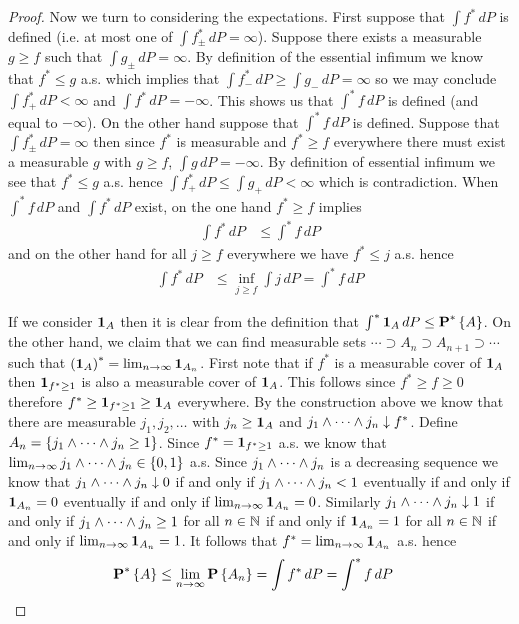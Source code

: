 \begin{proof}
Now we turn to considering the expectations.  First suppose that $\int f^* \, dP$ is defined (i.e. at most one of $\int f^*_\pm \, dP = \infty$).  Suppose there exists a measurable $g \geq f$ such
that $\int g_\pm \, dP = \infty$.  By definition of the essential infimum we know that $f^* \leq g$ a.s. which implies that $\int f^*_- \, dP \geq \int g_- \, dP = \infty$ so we may conclude $\int f^*_+ \, dP < \infty$ and $\int f^* \, dP = -\infty$.  This shows us that $\int^* f \, dP$ is defined (and equal to $-\infty$).    On the other hand suppose that $\int^* f \, dP$ is defined. Suppose that $\int f_\pm^* \, dP = \infty$ then since $f^*$ is measurable and $f^* \geq f$  everywhere there must exist a measurable $g$ with $g \geq f$, $\int g \, dP = -\infty$.  By definition of essential infimum we see that $f^* \leq g$ a.s. hence $\int f^*_+ \, dP \leq \int g_+ \, dP < \infty$ which is contradiction.  When $\int^* f \, dP$ and $\int f^* \, dP$ exist, on the one hand $f^* \geq f$ implies
\begin{align*}
\int f^* \, dP &\leq \int^* f \, dP
\end{align*}
and on the other hand for all $j \geq f$ everywhere we have $f^* \leq j$ a.s. hence
\begin{align*}
\int f^* \, dP &\leq \inf_{j \geq f} \int j \, dP = \int^* f \, dP
\end{align*}

If we consider $\textbf{1}_{A}$ then it is clear from the definition that $\int^* \textbf{1}_{A} \, dP \leq \textbf{P}^* \left \{A \right \}$.  On the other hand, we claim that we can find measurable sets $\dotsb \supset A_n \supset A_{n+1} \supset \dotsb$ such that $\left( \textbf{1}_{A} \right)^* = \lim_{n \to \infty} \textbf{1}_{A_n}$.  First note that if $f^*$ is a measurable cover of $\textbf{1}_{A}$ then $\textbf{1}_{f^* \geq 1}$ is also a measurable cover of $\textbf{1}_{A}$.  This follows since $f^* \geq f \geq 0$ therefore $f^* \geq \textbf{1}_{f^* \geq 1} \geq \textbf{1}_{A}$ everywhere.  By the construction above we know that there are measurable $j_1, j_2, \dotsc$ with $j_n \geq \textbf{1}_{A}$ and $j_1 \wedge \dotsb \wedge j_n  \downarrow f^*$.  Define $A_n = \lbrace j_1 \wedge \dotsb \wedge j_n \geq 1 \rbrace$.  Since $f^* =  \textbf{1}_{f^* \geq 1}$ a.s. we know that $\lim_{n\to \infty} j_1 \wedge \dotsb \wedge j_n \in \lbrace 0, 1 \rbrace$ a.s.  Since
$j_1 \wedge \dotsb \wedge j_n$ is a decreasing sequence we know that $ j_1 \wedge \dotsb \wedge j_n \downarrow 0$ if and only if $j_1 \wedge \dotsb \wedge j_n < 1$ eventually if and only if $\textbf{1}_{A_n} = 0$ eventually if and only if $\lim_{n \to \infty} \textbf{1}_{A_n} = 0$.  Similarly $ j_1 \wedge \dotsb \wedge j_n \downarrow 1$ if and only if $j_1 \wedge \dotsb \wedge j_n \geq 1$ for all $n \in \mathbb{N}$ if and only if $\textbf{1}_{A_n} = 1$ for all $n \in \mathbb{N}$ if and only if $\lim_{n \to \infty} \textbf{1}_{A_n} = 1$.  It follows that $f^* = \lim_{n \to \infty} \textbf{1}_{A_n}$ a.s. hence
\begin{align*}
\textbf{P}^* \left \{A \right \} &\leq \lim_{n \to \infty} \textbf{P}\left \{A_n \right \} = \int f^* \, dP = \int^* f \, dP
\end{align*}
\end{proof}

